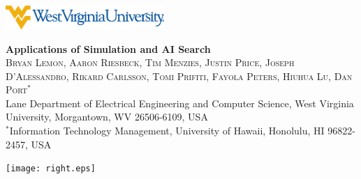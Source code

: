  \parbox[c]{0.1\linewidth}{~}
   \hfill
    \parbox[c]{0.1\linewidth}{\includegraphics[width=6cm]{left.eps}}

    \hfill
    \parbox[c]{0.70\linewidth}{%
      \begin{center}
      {
        \textbf{\Huge{Applications of Simulation and AI Search}}\\[0.4em]
        \textsc{\normalsize Bryan Lemon, Aaron Riesbeck, Tim Menzies, Justin Price, Joseph D'Alessandro, Rikard Carlsson, Tomi Prifiti, Fayola Peters, Hiuhua Lu, Dan Port$^*$}\\[0.2em]
        {\normalsize Lane Department of Electrical Engineering and Computer Science, West Virginia University, Morgantown, WV 26506-6109, USA}\\[0.0em]
        {\normalsize $^*$Information Technology Management, University of Hawaii, Honolulu, HI 96822-2457, USA}
      }
      \end{center}}
    \hfill
    \parbox[c]{0.15\linewidth}{\texttt{[image: right.eps]}}


